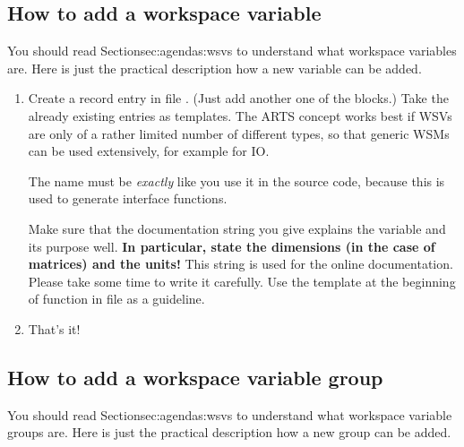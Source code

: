 \subsection{How to add a workspace variable}

You should read Section{sec:agendas:wsvs} to understand what workspace
variables are. Here is just the practical description how a new
variable can be added.

\begin{enumerate}
\item Create a record entry in file . (Just add
  another one of the  blocks.) Take the
  already existing entries as templates. The ARTS concept works best
  if WSVs are only of a rather limited number of different types, so
  that generic WSMs can be used extensively, for example for IO.
      
  The name must be \emph{exactly} like you use it in the source code,
  because this is used to generate interface functions.
  
  Make sure that the documentation string you give explains the
  variable and its purpose well. \textbf{In particular, state the
    dimensions (in the case of matrices) and the units!} This string
  is used for the online documentation. Please take some time to write
  it carefully. Use the template at the beginning of function
   in file  as a
  guideline. 

\item That's it!
\end{enumerate}


\subsection{How to add a workspace variable group}

You should read Section{sec:agendas:wsvs} to understand what workspace
variable groups are. Here is just the practical description how a new
group can be added.

